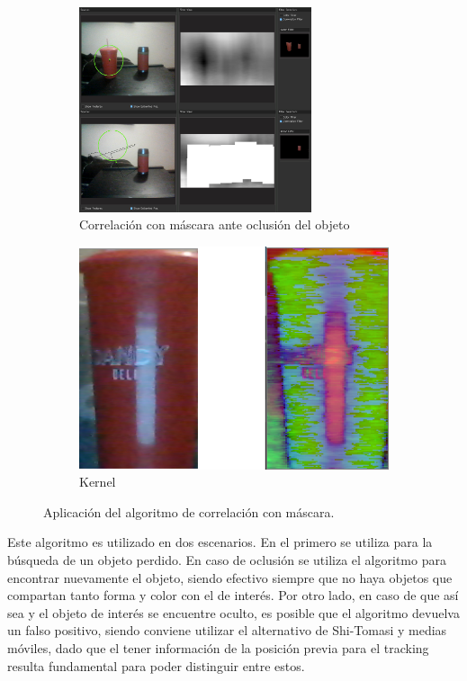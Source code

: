 \begin{figure}[H]
\centering

		\begin{subfigure}{.5\textwidth}
		\centering
		\includegraphics[width=0.75\textwidth]{Imagenes/corrmask.png}
		\caption{Correlación con máscara ante oclusión del objeto}
		\label{fig:sqdiff}
	\end{subfigure}
	\begin{subfigure}{.1\textwidth}
		\centering
		\includegraphics[width=1.5\textwidth]{Imagenes/kernelhsv.png}
		\caption{Kernel}
		\label{fig:kernel}
	\end{subfigure}
	\caption{Aplicación del algoritmo de correlación con máscara.}
	\label{fig:corrtest}
\end{figure}

Este algoritmo es utilizado en dos escenarios. En el primero se utiliza para la búsqueda de un objeto perdido. En caso de oclusión se utiliza el algoritmo para encontrar nuevamente el objeto, siendo efectivo siempre que no haya objetos que compartan tanto forma y color con el de interés. Por otro lado, en caso de que así sea y el objeto de interés se encuentre oculto, es posible que el algoritmo devuelva un falso positivo, siendo conviene utilizar el alternativo de Shi-Tomasi y medias móviles, dado que el tener información de la posición previa para el tracking resulta fundamental para poder distinguir entre estos.

